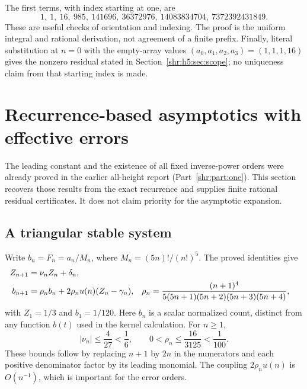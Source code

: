 \documentclass[11pt,letterpaper]{article}
\numberwithin{equation}{section}
\theoremstyle{definition}
\newcommand{\1}{\mathbf 1}
\begin{document}
The first terms, with index starting at one, are
\[
 1,\ 1,\ 16,\ 985,\ 141696,\ 36372976,\ 14083834704,
 \ 7372392431849.
\]
These are useful checks of orientation and indexing. The proof is the
uniform integral and rational derivation, not agreement of a finite
prefix. Finally, literal substitution at $n=0$ with the empty-array
values $(a_0,a_1,a_2,a_3)=(1,1,1,16)$ gives the nonzero residual stated
in Section~\ref{shr:h5:sec:scope}; no uniqueness claim from that starting index
is made.

\section{Recurrence-based asymptotics with effective errors}
\label{shr:h5:asy:section}
The leading constant and the existence of all fixed inverse-power orders
were already proved in the earlier all-height report (Part~\ref{shr:part:one}).
This section recovers those results from the exact recurrence and supplies
finite rational residual certificates. It does not claim priority for the
asymptotic expansion.

\subsection{A triangular stable system}
Write $b_n=F_n=a_n/M_n$, where $M_n=(5n)!/(n!)^5$. The proved identities give
\begin{align}
 Z_{n+1}&=\nu_nZ_n+\delta_n,\notag\\
 b_{n+1}&=\rho_nb_n+2\rho_nu(n)(Z_n-\gamma_n),&
 \rho_n&=\frac{(n+1)^4}{5(5n+1)(5n+2)(5n+3)(5n+4)},
 \label{shr:h5:asy:system}
\end{align}
with $Z_1=1/3$ and $b_1=1/120$. Here $b_n$ is a scalar normalized count,
distinct from any function $b(t)$ used in the kernel calculation.
For $n\ge1$,
\begin{equation}
 |\nu_n|\le\frac4{27}<\frac16,\qquad
 0<\rho_n\le\frac{16}{3125}<\frac1{100}.
 \label{shr:h5:asy:contractions}
\end{equation}
These bounds follow by replacing $n+1$ by $2n$ in the numerators and
each positive denominator factor by its leading monomial. The coupling
$2\rho_nu(n)$ is $O(n^{-1})$, which is important for the error orders.
\end{document}
